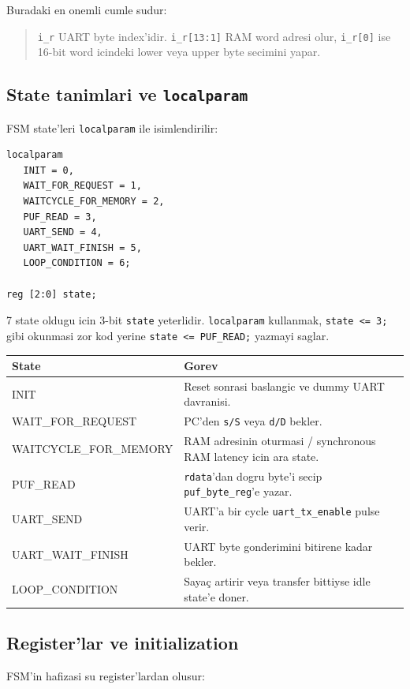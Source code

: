 \documentclass[11pt,a4paper]{article}
\begin{document}
Buradaki en onemli cumle sudur:

\begin{quote}
\texttt{i\_r} UART byte index'idir. \texttt{i\_r[13:1]} RAM word adresi olur, \texttt{i\_r[0]} ise 16-bit word icindeki lower veya upper byte secimini yapar.
\end{quote}

\subsection{State tanimlari ve \texttt{localparam}}
FSM state'leri \texttt{localparam} ile isimlendirilir:

\begin{lstlisting}[style=verilogstyle]
localparam
   INIT = 0,
   WAIT_FOR_REQUEST = 1,
   WAITCYCLE_FOR_MEMORY = 2,
   PUF_READ = 3,
   UART_SEND = 4,
   UART_WAIT_FINISH = 5,
   LOOP_CONDITION = 6;

reg [2:0] state;
\end{lstlisting}

7 state oldugu icin 3-bit \texttt{state} yeterlidir. \texttt{localparam} kullanmak, \texttt{state <= 3;} gibi okunmasi zor kod yerine \texttt{state <= PUF\_READ;} yazmayi saglar.

\begin{longtable}{>{\ttfamily}p{4.7cm}p{9.9cm}}
\toprule
State & Gorev \\
\midrule
\endhead
INIT & Reset sonrasi baslangic ve dummy UART davranisi. \\
WAIT\_FOR\_REQUEST & PC'den \texttt{s/S} veya \texttt{d/D} bekler. \\
WAITCYCLE\_FOR\_MEMORY & RAM adresinin oturmasi / synchronous RAM latency icin ara state. \\
PUF\_READ & \texttt{rdata}'dan dogru byte'i secip \texttt{puf\_byte\_reg}'e yazar. \\
UART\_SEND & UART'a bir cycle \texttt{uart\_tx\_enable} pulse verir. \\
UART\_WAIT\_FINISH & UART byte gonderimini bitirene kadar bekler. \\
LOOP\_CONDITION & Sayaç artirir veya transfer bittiyse idle state'e doner. \\
\bottomrule
\end{longtable}

\subsection{Register'lar ve initialization}
FSM'in hafizasi su register'lardan olusur:
\end{document}
